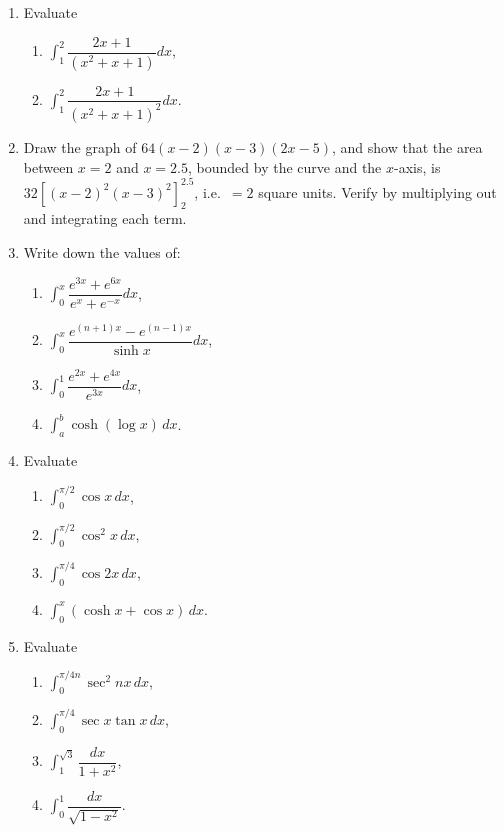 \documentclass[11pt, a4paper]{article}
\begin{document}
\begin{enumerate}[leftmargin=2em]
\item Evaluate
\begin{enumerate}[label=(\roman*)]
\item $\displaystyle\int_1^2 \dfrac{2x+1}{(x^2+x+1)}dx$,
\item $\displaystyle\int_1^2 \dfrac{2x+1}{(x^2+x+1)^2}dx$.
\end{enumerate}

\item Draw the graph of $64(x-2)(x-3)(2x-5)$, and show that the area between $x=2$ and $x=2.5$, bounded by the curve and the $x$-axis, is $32\left[(x-2)^2(x-3)^2\right]_2^{2.5}$, i.e.\ $=2$ square units. Verify by multiplying out and integrating each term.

\item Write down the values of:
\begin{enumerate}[label=(\roman*)]
\item $\displaystyle\int_0^x \dfrac{e^{3x}+e^{6x}}{e^x+e^{-x}}dx$,
\item $\displaystyle\int_0^x \dfrac{e^{(n+1)x}-e^{(n-1)x}}{\sinh x}dx$,
\item $\displaystyle\int_0^1 \dfrac{e^{2x}+e^{4x}}{e^{3x}}dx$,
\item $\displaystyle\int_a^b \cosh(\log x)\, dx$.
\end{enumerate}

\item Evaluate
\begin{enumerate}[label=(\roman*)]
\item $\displaystyle\int_0^{\pi/2} \cos x\, dx$,
\item $\displaystyle\int_0^{\pi/2}\cos^2 x\, dx$,
\item $\displaystyle\int_0^{\pi/4}\cos 2x\, dx$,
\item $\displaystyle\int_0^x (\cosh x + \cos x)\, dx$.
\end{enumerate}

\item Evaluate
\begin{enumerate}[label=(\roman*)]
\item $\displaystyle\int_0^{\pi/4n}\sec^2 nx\, dx$,
\item $\displaystyle\int_0^{\pi/4}\sec x\tan x\, dx$,
\item $\displaystyle\int_1^{\sqrt3}\dfrac{dx}{1+x^2}$,
\item $\displaystyle\int_0^1 \dfrac{dx}{\sqrt{1-x^2}}$.
\end{enumerate}


\end{enumerate}
\end{document}
